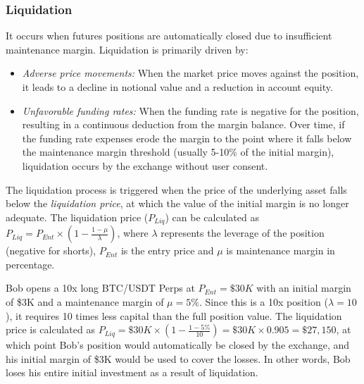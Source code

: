\subsubsection{Liquidation}\label{subsec:liquidation}
It occurs when futures positions are automatically closed due to insufficient maintenance margin. Liquidation is primarily driven by:
\begin{itemize}
	\item \textsl{Adverse price movements:} When the market price moves against the position, it leads to a decline in notional value and a reduction in account equity.

	\item \textsl{Unfavorable funding rates:} When the funding rate is negative for the position, resulting in a continuous deduction from the margin balance. Over time, if the funding rate expenses erode the margin to the point where it falls below the maintenance margin threshold (usually 5-10\% of the initial margin), liquidation occurs by the exchange without user consent.
\end{itemize}
The liquidation process is triggered when the price of the underlying asset falls below the \textit{liquidation price}, at which the value of the initial margin is no longer adequate. The liquidation price ($P_{Liq}$) can be calculated as \(P_{Liq} = P_{Ent} \times \left( 1 - \frac{1 - \mu}{\lambda} \right)\), where \(\lambda\) represents the leverage of the position (negative for shorts), \(P_{Ent}\) is the entry price and \(\mu\) is maintenance margin in percentage.

\begin{example}\label{ex:funding2}
	Bob opens a 10x long BTC/USDT Perps at \(P_{Ent} = \$30K\) with an initial margin of \$3K and a maintenance margin of \(\mu = 5\%\). Since this is a 10x position (\(\lambda = 10\)), it requires 10 times less capital than the full position value. The liquidation price is calculated as \(P_{Liq} = \$30K \times ( 1 - \frac{1 - 5\%}{10} ) = \$30K \times 0.905 = \$27,150\), at which point Bob’s position would automatically be closed by the exchange, and his initial margin of \$3K would be used to cover the losses. In other words, Bob loses his entire initial investment as a result of liquidation.
\end{example}